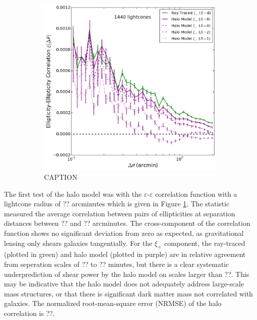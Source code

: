\documentclass[%
 reprint,
 amsmath,amssymb,
 aps,nofootinbib
]{revtex4-1}
\begin{document}
\begin{figure}
\begin{subfigure}{0.475\textwidth}
        \label{gg_corr}
    \end{subfigure}
    ~~
    \begin{subfigure}{0.475\textwidth}
        \includegraphics[width=\textwidth]{figs-swe/thesis/gg_progression.png}
        \captionsetup{justification=raggedright,singlelinecheck=false}
        \caption{CAPTION}
        \label{gg_corr_series}
    \end{subfigure}
    \caption{}
\end{figure}

The first test of the halo model was with the $\varepsilon$-$\varepsilon$ correlation function with a lightcone radius of ?? arcminutes which is given in Figure \ref{gg_corr}. The statistic measured the average correlation between pairs of ellipticities at separation distances between ?? and ?? arcminutes. The cross-component of the correlation function shows no significant deviation from zero as expected, as gravitational lensing only shears galaxies tangentially. For the $\xi_+$ component, the ray-traced (plotted in green) and halo model (plotted in purple) are in relative agreement from seperation scales of ?? to ?? minutes, but there is a clear systematic underprediction of shear power by the halo model on scales larger than ??. This may be indicative that the halo model does not adequately address large-scale mass structures, or that there is significant dark matter mass not correlated with galaxies. The normalized root-mean-square error (NRMSE) of the halo correlation is ??.
\end{document}
